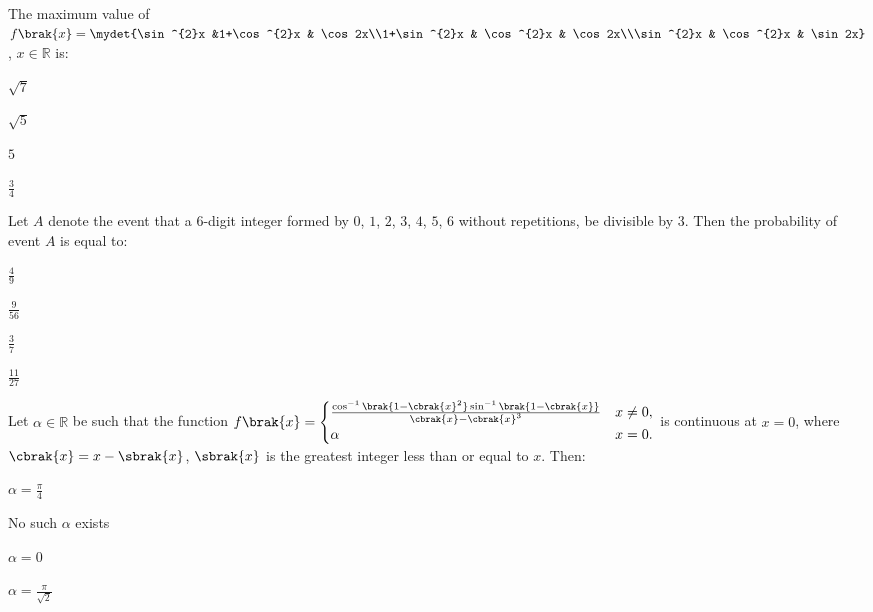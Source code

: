 \iffalse
\title{2021}
\author{EE24Btech11024}
\section{mcq-single}
\fi

\item The maximum value of $f\brak{x} = \mydet{\sin^{2}x &1+\cos^{2}x & \cos 2x\\1+\sin^{2}x & \cos^{2}x & \cos 2x\\\sin^{2}x & \cos^{2}x & \sin 2x}$, $x \in \mathbb{R}$ is:

\hfill{}
\begin{enumerate}
\begin{multicols}{4}
\item $\sqrt{7}$
\item $\sqrt{5}$
\item $5$
\item $\frac{3}{4}$
\end{multicols}
\end{enumerate}

\item Let $A$ denote the event that a $6$-digit integer formed by $0$, $1$, $2$, $3$, $4$, $5$, $6$ without repetitions, be divisible by $3$. Then the probability of event $A$ is equal to:

\hfill{}
\begin{enumerate}
\begin{multicols}{4}
\item $\frac{4}{9}$
\item $\frac{9}{56}$
\item $\frac{3}{7}$
\item $\frac{11}{27}$
\end{multicols}
\end{enumerate}

\item Let $\alpha \in \mathbb{R}$ be such that the function $f\brak{x} = \begin{cases} \frac{\cos^{-1}\brak{1-\cbrak{x}^2}\sin^{-1}\brak{1-\cbrak{x}}}{\cbrak{x}-\cbrak{x}^3} & x\neq 0, \\\alpha & x=0 .\end{cases}$ is continuous at $x=0$, where $\cbrak{x}=x-\sbrak{x}$, $\sbrak{x}$ is the greatest integer less than or equal to $x$. Then:

\hfill{}
\begin{enumerate}
\begin{multicols}{4}
\item $\alpha=\frac{\pi}{4}$
\item No such $\alpha$ exists
\item $\alpha=0$
\item $\alpha=\frac{\pi}{\sqrt{2}}$
\end{multicols}
\end{enumerate}

